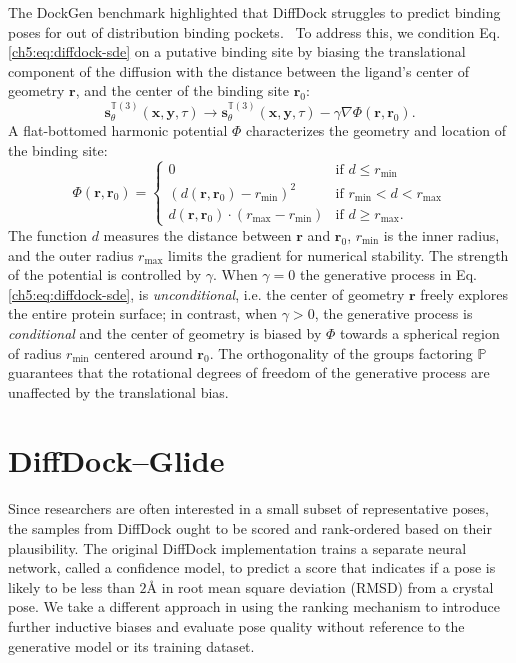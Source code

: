 The DockGen benchmark highlighted that DiffDock struggles to predict binding poses for out of distribution binding pockets.~\cite{corso2024dockgen} To address this, we condition Eq. \ref{ch5:eq:diffdock-sde} on a putative binding site by biasing the translational component of the diffusion with the distance between the ligand's center of geometry $\mathbf{r}$, and the center of the binding site $\mathbf{r}_0$:
\begin{equation}
    \label{ch5:eq:diffdock-sde-conditional}
        \mathbf{s}^{\mathbb{T}(3)}_\theta(\mathbf{x}, \mathbf{y}, \tau)\rightarrow \mathbf{s}^{\mathbb{T}(3)}_\theta(\mathbf{x}, \mathbf{y}, \tau) - \gamma \nabla \Phi(\mathbf{r},\mathbf{r}_0).
\end{equation}
A flat-bottomed harmonic potential $\Phi$ characterizes the geometry and location of the binding site:
\begin{equation}
    \label{ch5:eq:potential}
    \Phi(\mathbf{r}, \mathbf{r}_0) =
    \begin{cases}
    0 &\text{if } d \leq r_{\mathrm{min}} \\
    (d(\mathbf{r},\mathbf{r}_0) - r_{\mathrm{min}})^2 &\text{if } r_{\mathrm{min}} < d < r_{\mathrm{max}} \\
    d(\mathbf{r},\mathbf{r}_0)\cdot (r_{\mathrm{max}} - r_{\mathrm{min}}) &\text{if } d \geq r_{\mathrm{max}}.
    \end{cases}
\end{equation}
The function $d$ measures the distance between $\mathbf{r}$ and $\mathbf{r}_0$, $r_{\mathrm{min}}$ is the inner radius, and the outer radius $r_{\mathrm{max}}$ limits the gradient for numerical stability. The strength of the potential is controlled by $\gamma$. When $\gamma=0$ the generative process in Eq. \ref{ch5:eq:diffdock-sde}, is {\it unconditional}, i.e. the center of geometry $\mathbf{r}$ freely explores the entire protein surface; in contrast, when $\gamma > 0$, the generative process is {\it conditional} and the center of geometry is biased by $\Phi$ towards a spherical region of radius $r_\mathrm{min}$ centered around $\mathbf{r}_0$. The orthogonality of the groups factoring $\mathbb{P}$ guarantees that the rotational degrees of freedom of the generative process are unaffected by the translational bias.

\section{DiffDock--Glide}
Since researchers are often interested in a small subset of representative poses, the samples from DiffDock ought to be scored and rank-ordered based on their plausibility. The original DiffDock implementation trains a separate neural network, called a confidence model, to predict a score that indicates if a pose is likely to be less than $2${\AA} in root mean square deviation (RMSD) from a crystal pose. We take a different approach in using the ranking mechanism to introduce further inductive biases and evaluate pose quality without reference to the generative model or its training dataset.


